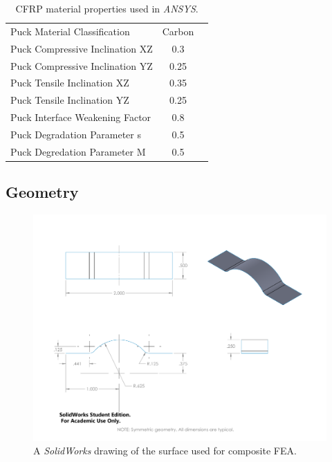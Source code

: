 \begin{table}[htp]
\begin{tabular}{lcc}
        Puck Material Classification & Carbon &\\
        Puck Compressive Inclination XZ & 0.3 &\\
        Puck Compressive Inclination YZ & 0.25 &\\
        Puck Tensile Inclination XZ & 0.35 &\\
        Puck Tensile Inclination YZ & 0.25 &\\
        
        Puck Interface Weakening Factor & 0.8 &\\
        Puck Degradation Parameter s & 0.5 &\\
        Puck Degredation Parameter M & 0.5 &\\
              
        
    \end{tabular}
    \caption{CFRP material properties used in \textit{ANSYS}.}
    \label{tab:ansys-material-properties}
\end{table}

\clearpage

\subsection{Geometry}

\begin{figure}[htp]
\centering
\includegraphics[width=1\textwidth]{./figures/fea/fea-surface-geometry}
\caption{A \emph{SolidWorks} drawing of the surface used for composite FEA.}
\label{fig:fea-surface-geometry}
\end{figure}

